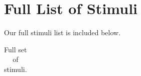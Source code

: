 \documentclass[
  12pt,
]{scrartcl}
\begin{document}


\section{Full List of Stimuli}\label{sec-full-list-of-stimuli}

Our full stimuli list is included below.

\begin{landscape}

\begingroup\fontsize{6}{8}\selectfont

\begin{longtable}{lrrllll}

\caption{\label{tbl-appendixstimuli}Full set of stimuli.}

\tabularnewline


\end{longtable}
\end{landscape}
\end{document}
